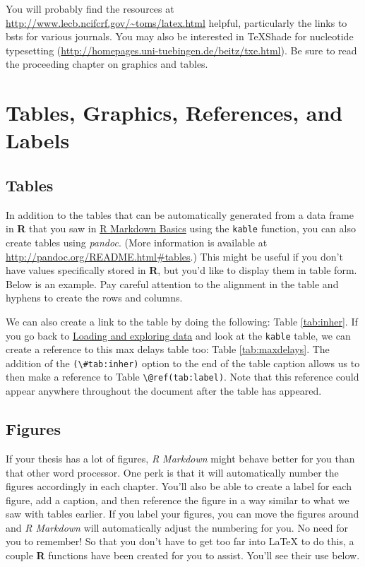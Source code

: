 \documentclass[12pt,twoside]{deuthesis}
\begin{document}
You will probably find the resources at \url{http://www.lecb.ncifcrf.gov/~toms/latex.html} helpful, particularly the links to bsts for various journals. You may also be interested in TeXShade for nucleotide typesetting (\url{http://homepages.uni-tuebingen.de/beitz/txe.html}). Be sure to read the proceeding chapter on graphics and tables.

\hypertarget{ref-labels}{%
\chapter{Tables, Graphics, References, and Labels}\label{ref-labels}}

\hypertarget{tables}{%
\section{Tables}\label{tables}}

In addition to the tables that can be automatically generated from a data frame in \textbf{R} that you saw in \protect\hyperlink{rmd-basics}{R Markdown Basics} using the \texttt{kable} function, you can also create tables using \emph{pandoc}. (More information is available at \url{http://pandoc.org/README.html\#tables}.) This might be useful if you don't have values specifically stored in \textbf{R}, but you'd like to display them in table form. Below is an example. Pay careful attention to the alignment in the table and hyphens to create the rows and columns.

We can also create a link to the table by doing the following: Table \ref{tab:inher}. If you go back to \protect\hyperlink{loading-and-exploring-data}{Loading and exploring data} and look at the \texttt{kable} table, we can create a reference to this max delays table too: Table \ref{tab:maxdelays}. The addition of the \texttt{(\textbackslash{}\#tab:inher)} option to the end of the table caption allows us to then make a reference to Table \texttt{\textbackslash{}@ref(tab:label)}. Note that this reference could appear anywhere throughout the document after the table has appeared.

\clearpage

\hypertarget{figures}{%
\section{Figures}\label{figures}}

If your thesis has a lot of figures, \emph{R Markdown} might behave better for you than that other word processor. One perk is that it will automatically number the figures accordingly in each chapter. You'll also be able to create a label for each figure, add a caption, and then reference the figure in a way similar to what we saw with tables earlier. If you label your figures, you can move the figures around and \emph{R Markdown} will automatically adjust the numbering for you. No need for you to remember! So that you don't have to get too far into LaTeX to do this, a couple \textbf{R} functions have been created for you to assist. You'll see their use below.
\end{document}
